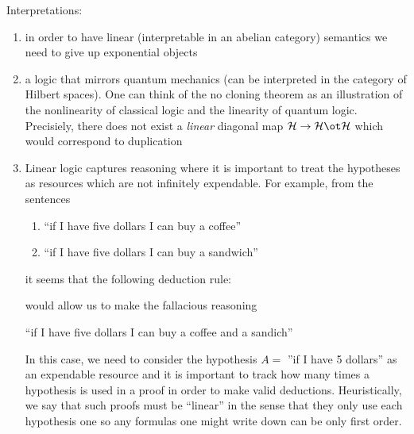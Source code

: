 \documentclass[12pt]{article}
\begin{document}
Interpretations:
\begin{enumerate}
\item in order to have linear (interpretable in an abelian category) semantics we need to give up exponential objects
\item a logic that mirrors quantum mechanics (can be interpreted in the category of Hilbert spaces). One can think of the no cloning theorem as an illustration of the nonlinearity of classical logic and the linearity of quantum logic. Precisiely, there does not exist a \textit{linear} diagonal map $\mathcal{H} \to \mathcal{H} \ot \mathcal{H}$ which would correspond to duplication
\item Linear logic captures reasoning where it is important to treat the hypotheses as resources which are not infinitely expendable. For example, from the sentences
\begin{enumerate}
\item ``if I have five dollars I can buy a coffee''
\item ``if I have five dollars I can buy a sandwich'' 
\end{enumerate}
it seems that the following deduction rule:
\begin{center}
\begin{prooftree}
\end{prooftree}
\end{center}
would allow us to make the fallacious reasoning
\begin{center}
``if I have five dollars I can buy a coffee and a sandich''
\end{center}
In this case, we need to consider the hypothesis $A =$ ''if I have 5 dollars'' as an expendable resource and it is important to track how many times a hypothesis is used in a proof in order to make valid deductions. Heuristically, we say that such proofs must be ``linear'' in the sense that they only use each hypothesis one so any formulas one might write down can be only first order. 
\end{enumerate}
\end{document}
